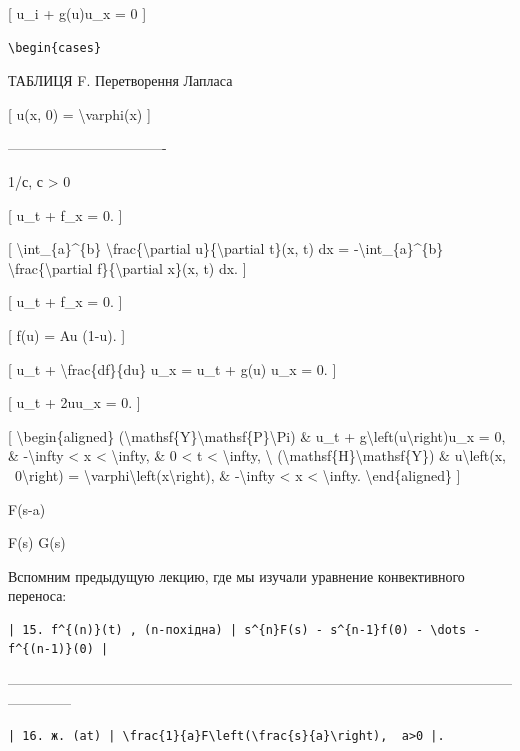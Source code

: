 \documentclass[
]{article}
\begin{document}
{[} u\_i + g(u)u\_x = 0 {]}

\begin{verbatim}
\begin{cases}
\end{verbatim}

ТАБЛИЦЯ F. Перетворення Лапласа

{[} u(x, 0) = \textbackslash varphi(x) {]}

\textbar----------------------------------\textbar{}

1/с, с \textgreater{} 0 \textbar{}

{[} u\_t + f\_x = 0. {]}

{[} \textbackslash int\_\{a\}\^{}\{b\}
\textbackslash frac\{\textbackslash partial u\}\{\textbackslash partial
t\}(x, t) dx = -\textbackslash int\_\{a\}\^{}\{b\}
\textbackslash frac\{\textbackslash partial f\}\{\textbackslash partial
x\}(x, t) dx. {]}

{[} u\_t + f\_x = 0. {]}

{[} f(u) = Au (1-u). {]}

{[} u\_t + \textbackslash frac\{df\}\{du\} u\_x = u\_t + g(u) u\_x = 0.
{]}

{[} u\_t + 2uu\_x = 0. {]}

{[} \textbackslash begin\{aligned\}
(\textbackslash mathsf\{Y\}\textbackslash mathsf\{P\}\textbackslash Pi)
\& u\_t + g\textbackslash left(u\textbackslash right)u\_x = 0, \&
-\textbackslash infty \textless{} x \textless{} \textbackslash infty, \&
0 \textless{} t \textless{} \textbackslash infty, \textbackslash{}
(\textbackslash mathsf\{H\}\textbackslash mathsf\{Y\}) \&
u\textbackslash left(x, ~0\textbackslash right) =
\textbackslash varphi\textbackslash left(x\textbackslash right), \&
-\textbackslash infty \textless{} x \textless{} \textbackslash infty.
\textbackslash end\{aligned\} {]}

F(s-a) \textbar{}

F(s) G(s) \textbar{}

Вспомним предыдущую лекцию, где мы изучали уравнение конвективного
переноса:

\begin{verbatim}
| 15. f^{(n)}(t) , (n-похідна) | s^{n}F(s) - s^{n-1}f(0) - \dots - f^{(n-1)}(0) |
\end{verbatim}

\textbar------------------------------------------------------------------------\textbar--------------------------------------------------\textbar{}

\begin{verbatim}
| 16. ж. (at) | \frac{1}{a}F\left(\frac{s}{a}\right),  a>0 |.
\end{verbatim}
\end{document}
